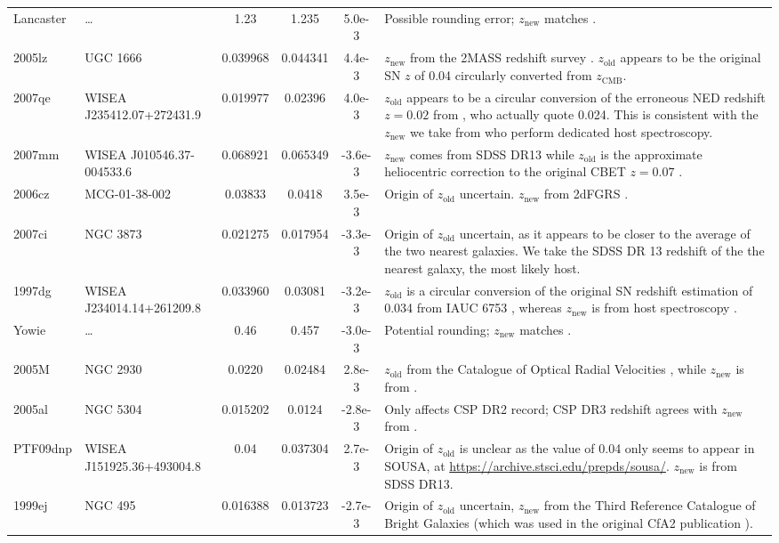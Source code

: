 \documentclass[
  journal=pasa,
  manuscript=research-paper,
  year=2022,
]{cup-journal}
\newcommand{\zCMB}[1]{\ensuremath{z_{\text{CMB}}^{\mathrm{#1}}}}
\newcommand{\znew}{$z_{\text{new}}$}
\newcommand{\zold}{$z_{\text{old}}$}
\begin{document}
\begin{landscape}
\begin{ThreePartTable}
\begin{longtable}{llS[table-format=1.7]S[table-format=1.6]S[table-format=2.1e-3]p{11cm}}
Lancaster & \dots & 1.23 & 1.235 & 5.0e-3 & Possible rounding error; \znew{} matches \citet{Riess2007}. \\
2005lz & UGC 1666 & 0.039968 & 0.044341 & 4.4e-3 & \znew{} from the 2MASS redshift survey \citep[2MRS, ][]{Huchra2012}. \zold{} appears to be the original SN $z$ of 0.04 \citep{Silverman2012, Blondin2012} circularly converted from \zCMB{}.\\
2007qe & WISEA J235412.07+272431.9 & 0.019977 & 0.02396 & 4.0e-3 & \zold{} appears to be a circular conversion of the erroneous NED redshift $z=0.02$ from \citet{Garnavich2007}, who actually quote 0.024. This is consistent with the \znew{} we take from \citet{Childress2013} who perform dedicated host spectroscopy. \\
2007mm & WISEA J010546.37-004533.6 & 0.068921 & 0.065349 & -3.6e-3 & \znew{} comes from SDSS DR13 while \zold{} is the approximate heliocentric correction to the original CBET $z=0.07$ \citep{Bassett2007}.\\
2006cz & MCG-01-38-002 & 0.03833 & 0.0418 & 3.5e-3 & Origin of \zold{} uncertain. \znew{} from 2dFGRS \citep{Colless2003}. \\
2007ci & NGC 3873 & 0.021275 & 0.017954 & -3.3e-3 & Origin of \zold{} uncertain, as it appears to be closer to the average of the two nearest galaxies. We take the SDSS DR 13 redshift of the the nearest galaxy, the most likely host. \\
1997dg & WISEA J234014.14+261209.8 & 0.033960 & 0.03081 & -3.2e-3 &\zold{} is a circular conversion of the original SN redshift estimation of 0.034 from IAUC 6753 \citep{Wang1997}, whereas \znew{} is from host spectroscopy \citep{Jha2006}. \\ 
Yowie & \ldots & 0.46 & 0.457 & -3.0e-3 & Potential rounding; \znew{} matches \citet{Riess2007}.\\
2005M & NGC 2930 & 0.0220 & 0.02484 & 2.8e-3 & \zold{} from the Catalogue of Optical Radial Velocities \citep[CORV, ][]{Fouque1992}, while \znew{} is from \citet{Childress2013}. \\
2005al & NGC 5304 & 0.015202 & 0.0124 & -2.8e-3 & Only affects CSP DR2 record; CSP DR3 redshift agrees with \znew{} from \citet{Childress2013}. \\
PTF09dnp & WISEA J151925.36+493004.8 & 0.04 & 0.037304 & 2.7e-3 & Origin of \zold{} is unclear as the value of 0.04 only seems to appear in SOUSA, at \url{https://archive.stsci.edu/prepds/sousa/}. \znew{} is from SDSS DR13. \\
1999ej & NGC 495 & 0.016388 & 0.013723 & -2.7e-3 & Origin of \zold{} uncertain, \znew{} from the Third Reference Catalogue of Bright Galaxies \citep[RC3,][]{deVaucoleurs1991} (which was used in the original CfA2 publication \citep{Jha2006}).\\

\end{longtable}
\end{ThreePartTable}
\end{landscape}
\end{document}
